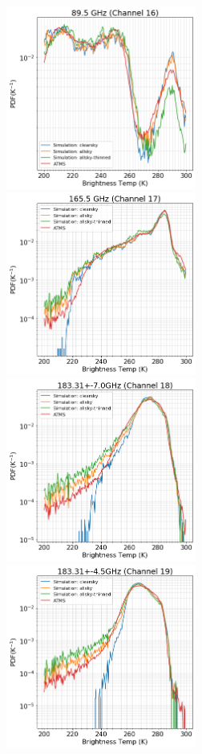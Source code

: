 \documentclass[12pt]{article}
\begin{document}
\begin{figure}[p]
	\centering
	\includegraphics[height=60mm]{ATMS_C16_distribution}\hspace{5mm}%
	\includegraphics[height=60mm]{ATMS_C17_distribution}
	\includegraphics[height=60mm]{ATMS_C18_distribution}\hspace{5mm}%
	\includegraphics[height=60mm]{ATMS_C19_distribution}

\end{figure}
\end{document}
